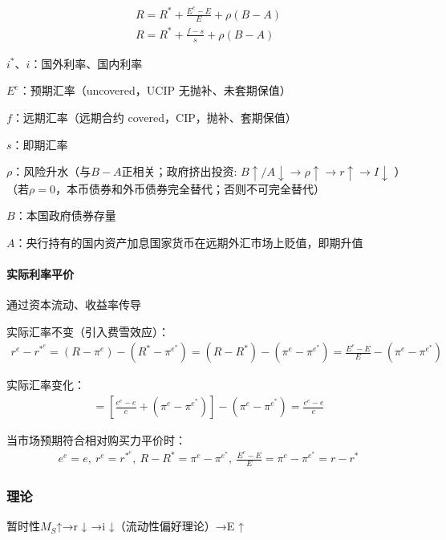 \documentclass[12pt]{book}
\begin{document}
\begin{gather*}
    R = R^\ast+\frac{E^e-E}{E}+\rho\left(B-A\right) \\
    R = R^\ast+\frac{f-s}{s}+\rho\left(B-A\right) 
\end{gather*}
\par $i^\ast$、$i$：国外利率、国内利率  
\par $E^e$：预期汇率（uncovered，UCIP 无抛补、未套期保值）  
\par $f$：远期汇率（远期合约 covered，CIP，抛补、套期保值）  
\par $s$：即期汇率  
\par $\rho$：风险升水（与$B−A$正相关；政府挤出投资: $B↑/A↓→\rho ↑ →r↑→I↓$ ）（若$\rho =0$，本币债券和外币债券完全替代；否则不可完全替代）  
\par $B$：本国政府债券存量   
\par $A$：央行持有的国内资产加息国家货币在远期外汇市场上贬值，即期升值



\paragraph{实际利率平价}

通过资本流动、收益率传导

实际汇率不变（引入费雪效应）：
\begin{gather*}
    r^e-r^{\ast^e}=\left(R-\pi^e\right)-\left(R^\ast-\pi^{e^\ast}\right)=\left(R-R^\ast\right)-\left(\pi^e-\pi^{e^\ast}\right)=\frac{E^e-E}{E}-\left(\pi^e-\pi^{e^\ast}\right)
\end{gather*}


实际汇率变化：
\begin{gather*}
    =\left[\frac{e^e-e}{e}+\left(\pi^e-\pi^{e^\ast}\right)\right]-\left(\pi^e-\pi^{e^\ast}\right)=\frac{e^e-e}{e} 
\end{gather*}


当市场预期符合相对购买力平价时：
\begin{gather*}
    e^e=e,\ r^e=r^{\ast^e},\ R-R^\ast=\pi^e-\pi^{e^\ast},\ \frac{E^e-E}{E}=\pi^e-\pi^{e^\ast}=r-r^\ast
\end{gather*}

\subsubsection{理论}

暂时性$M_S$↑→r ↓ →i ↓（流动性偏好理论）→E ↑
\end{document}
